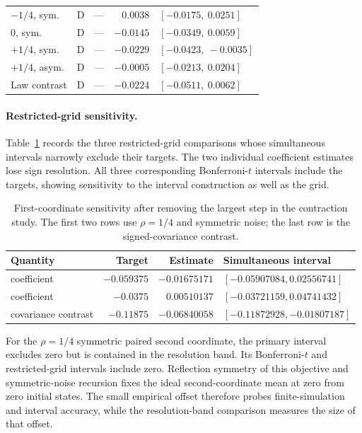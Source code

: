 \begin{table}[!htbp]
\begin{tabular}{@{}lcrlrl@{}}
$-1/4$, sym. & D & \multicolumn{2}{c}{---} & $0.0038$ & $[-0.0175,\ 0.0251]$ \\
$0$, sym. & D & \multicolumn{2}{c}{---} & $-0.0145$ & $[-0.0349,\ 0.0059]$ \\
$+1/4$, sym. & D & \multicolumn{2}{c}{---} & $-0.0229$ & $[-0.0423,\ -0.0035]$ \\
$+1/4$, asym. & D & \multicolumn{2}{c}{---} & $-0.0005$ & $[-0.0213,\ 0.0204]$ \\
Law contrast & D & \multicolumn{2}{c}{---} & $-0.0224$ & $[-0.0511,\ 0.0062]$ \\
\bottomrule
\end{tabular}
\end{table}

\paragraph{Restricted-grid sensitivity.}
Table~\ref{tab:num-restricted-mechanism} records the three restricted-grid
comparisons whose simultaneous intervals narrowly exclude their targets.
The two individual coefficient estimates lose sign resolution.
All three corresponding Bonferroni-$t$ intervals include the targets,
showing sensitivity to the interval construction as well as the grid.

\begin{table}[tbp]
\centering\small
\setlength{\tabcolsep}{4pt}
\caption{First-coordinate sensitivity after removing the largest step
in the contraction study. The first two rows use $\rho=1/4$ and symmetric
noise; the last row is the signed-covariance contrast.}
\label{tab:num-restricted-mechanism}
\begin{tabular}{@{}lrrl@{}}
\toprule
Quantity & Target & Estimate & Simultaneous interval \\
\midrule
\Scaf{} coefficient & $-0.059375$ & $-0.01675171$ & $[-0.05907084,0.02556741]$ \\
\FedAvg{} coefficient & $-0.0375$ & $0.00510137$ & $[-0.03721159,0.04741432]$ \\
\Scaf{} covariance contrast & $-0.11875$ & $-0.06840058$ & $[-0.11872928,-0.01807187]$ \\
\bottomrule
\end{tabular}
\end{table}

For the $\rho=1/4$ symmetric paired second coordinate, the primary
interval excludes zero but is contained in the resolution band. Its
Bonferroni-$t$ and restricted-grid intervals include zero. Reflection
symmetry of this objective and symmetric-noise recursion fixes the ideal
second-coordinate mean at zero from zero initial states. The small
empirical offset therefore probes finite-simulation and interval accuracy,
while the resolution-band comparison measures the size of that offset.

